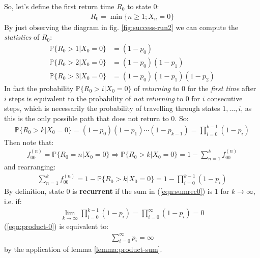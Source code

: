 \documentclass[../template.tex]{subfiles}
\begin{document}
\begin{example}
So, let's define the first return time $R_0$ to state $0$:
\begin{align*}
    R_0 = \min\{n \geq 1; X_n = 0\}
\end{align*}
By just observing the diagram in fig. \ref{fig:success-run2} we can compute the \textit{statistics} of $R_0$:
\begin{align*}
    \mathbb{P}\{R_0 > 1 | X_0 = 0\} &= (1-p_0)\\
    \mathbb{P}\{R_0 > 2 | X_0 = 0\} &= (1-p_0)(1-p_1)\\
    \mathbb{P}\{R_0 > 3 | X_0 = 0\} &= (1-p_0) (1-p_1) (1-p_2)
\end{align*} 
In fact the probability $\mathbb{P}\{R_0 > i|X_0=0\}$ of \textit{returning} to $0$ for the \textit{first time} after $i$ steps is equivalent to the probability of \textit{not returning} to $0$ for $i$ consecutive steps, which is necessarily the probability of travelling through states $1,\dots,i$, as this is the only possible path that does not return to $0$. So:
\begin{align} \label{eqn:pr0}
    \mathbb{P}\{R_0 > k|X_0=0\} = (1-p_0) (1-p_1) \cdots (1-p_{k-1}) = \prod_{i=0}^{k-1} (1-p_i)
\end{align} 
Then note that:
\begin{align*}
    f_{00}^{(n)} = \mathbb{P}\{R_0 = n|X_0 = 0\} \Rightarrow \mathbb{P}\{R_0 > k| X_0 = 0\} = 1 - \sum_{n=1}^{k} f_{00}^{(n)}
\end{align*}
and rearranging:
\begin{align}
    \sum_{n=1}^k f_{00}^{(n)} = 1- \mathbb{P}\{R_0 > k | X_0 = 0\} = 1 - \prod_{i=0}^{k-1} (1-p_i) \label{eqn:sumrec0}
\end{align}
By definition, state $0$ is \textbf{recurrent}  if the sum in (\ref{eqn:sumrec0}) is $1$ for $k \to \infty$, i.e. if:
\begin{align} \label{eqn:product-0}
    \lim_{k \to \infty} \prod_{i=0}^{k-1} (1-p_i) = \prod_{i=0}^{\infty} (1-p_i) = 0
\end{align}
(\ref{eqn:product-0}) is equivalent to:
\begin{align*}
    \sum_{i=0}^{\infty} p_i = \infty
\end{align*}
by the application of lemma \ref{lemma:product-sum}.

\medskip


\end{example}
\end{document}
